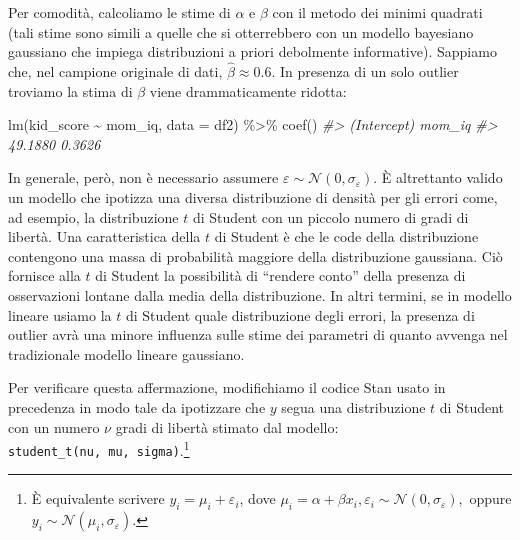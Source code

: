 \documentclass[
  11pt,
]{krantz}
\makeatletter
\newenvironment{Shaded}{\begin{snugshade}}{\end{snugshade}}
\newcommand{\AttributeTok}[1]{\textcolor[rgb]{0.61,0.61,0.61}{#1}}
\newcommand{\CommentTok}[1]{\textcolor[rgb]{0.37,0.37,0.37}{\textit{#1}}}
\newcommand{\FunctionTok}[1]{\textcolor[rgb]{0,0,0}{#1}}
\newcommand{\NormalTok}[1]{#1}
\newcommand{\SpecialCharTok}[1]{\textcolor[rgb]{0,0,0}{#1}}
\newenvironment{kframe}{%
\medskip{}
\setlength{\fboxsep}{.8em}
 \def\at@end@of@kframe{}%
 \ifinner\ifhmode%
  \def\at@end@of@kframe{\end{minipage}}%
  \begin{minipage}{\columnwidth}%
 \fi\fi%
 \def\FrameCommand##1{\hskip\@totalleftmargin \hskip-\fboxsep
 \colorbox{shadecolor}{##1}\hskip-\fboxsep
     \hskip-\linewidth \hskip-\@totalleftmargin \hskip\columnwidth}%
 \MakeFramed {\advance\hsize-\width
   \@totalleftmargin\z@ \linewidth\hsize
   \@setminipage}}%
 {\par\unskip\endMakeFramed%
 \at@end@of@kframe}
\renewenvironment{Shaded}{\begin{kframe}}{\end{kframe}}
\theoremstyle{definition}
\theoremstyle{definition}
\theoremstyle{definition}
\theoremstyle{definition}
\theoremstyle{remark}
\makeatother
\begin{document}
Per comodità, calcoliamo le stime di \(\alpha\) e \(\beta\) con il metodo dei minimi quadrati (tali stime sono simili a quelle che si otterrebbero con un modello bayesiano gaussiano che impiega distribuzioni a priori debolmente informative). Sappiamo che, nel campione originale di dati, \(\hat{\beta} \approx 0.6\). In presenza di un solo outlier troviamo la stima di \(\beta\) viene drammaticamente ridotta:

\begin{Shaded}
\begin{Highlighting}[]
\FunctionTok{lm}\NormalTok{(kid\_score }\SpecialCharTok{\textasciitilde{}}\NormalTok{ mom\_iq, }\AttributeTok{data =}\NormalTok{ df2) }\SpecialCharTok{\%\textgreater{}\%}
  \FunctionTok{coef}\NormalTok{()}
\CommentTok{\#\textgreater{} (Intercept)      mom\_iq }
\CommentTok{\#\textgreater{}     49.1880      0.3626}
\end{Highlighting}
\end{Shaded}

In generale, però, non è necessario assumere \(\varepsilon \sim \mathcal{N}(0, \sigma_{\varepsilon})\). È altrettanto valido un modello che ipotizza una diversa distribuzione di densità per gli errori come, ad esempio, la distribuzione \(t\) di Student con un piccolo numero di gradi di libertà. Una caratteristica della \(t\) di Student è che le code della distribuzione contengono una massa di probabilità maggiore della distribuzione gaussiana. Ciò fornisce alla \(t\) di Student la possibilità di ``rendere conto'' della presenza di osservazioni lontane dalla media della distribuzione. In altri termini, se in modello lineare usiamo la \(t\) di Student quale distribuzione degli errori, la presenza di outlier avrà una minore influenza sulle stime dei parametri di quanto avvenga nel tradizionale modello lineare gaussiano.

Per verificare questa affermazione, modifichiamo il codice Stan usato in precedenza in modo tale da ipotizzare che \(y\) segua una distribuzione \(t\) di Student con un numero \(\nu\) gradi di libertà stimato dal modello: \texttt{student\_t(nu,\ mu,\ sigma)}.\footnote{È equivalente scrivere \(y_i = \mu_i + \varepsilon_i\), dove \(\mu_i = \alpha + \beta x_i, \varepsilon_i \sim \mathcal{N}(0, \sigma_\varepsilon),\) oppure \(y_i \sim \mathcal{N}(\mu_i, \sigma_\varepsilon).\)}
\end{document}
